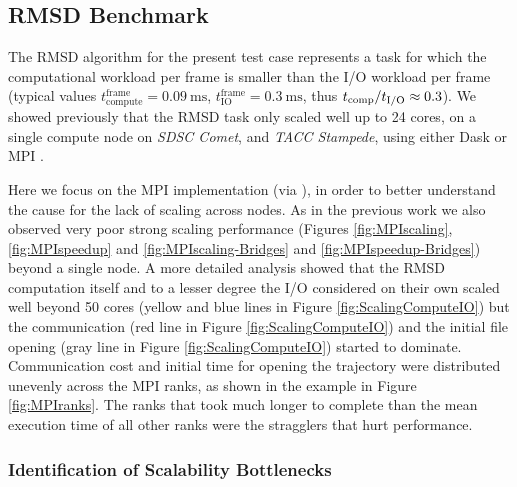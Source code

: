 \label{impl_exp}

\subsection{RMSD Benchmark}
\label{sec:RMSD}
The RMSD algorithm for the present test case represents a task for which the computational workload per frame is smaller than the I/O workload per frame (typical values $t_{\text{compute}}^{\text{frame}} = 0.09\ \text{ms}$, $t_{\text{IO}}^{\text{frame}} = 0.3\ \text{ms}$, thus ${t}_{\text{comp}}/{t}_{\text{I/O}} \approx 0.3$). 
We showed previously that the RMSD task only scaled well up to 24 cores, on a single compute node on \emph{SDSC Comet}, and \emph{TACC Stampede}, using either Dask or MPI \cite{Khoshlessan:2017ab}.

Here we focus on the MPI implementation (via  \cite{Dalcin:2011aa, Dalcin:2005aa}), in order to better understand the cause for the lack of scaling across nodes.
As in the previous work we also observed very poor strong scaling performance (Figures \ref{fig:MPIscaling}, \ref{fig:MPIspeedup} and \ref{fig:MPIscaling-Bridges} and \ref{fig:MPIspeedup-Bridges}) beyond a single node.
A more detailed analysis showed that the RMSD computation itself and to a lesser degree the I/O considered on their own scaled well beyond 50 cores (yellow and blue lines in Figure \ref{fig:ScalingComputeIO}) but the communication (red line in Figure \ref{fig:ScalingComputeIO}) and the initial file opening (gray line in Figure \ref{fig:ScalingComputeIO}) started to dominate.
Communication cost and initial time for opening the trajectory were distributed unevenly across the MPI ranks, as shown in the example in Figure \ref{fig:MPIranks}. 
The ranks that took much longer to complete than the mean execution time of all other ranks were the stragglers that hurt performance.

\subsubsection*{Identification of Scalability Bottlenecks}

